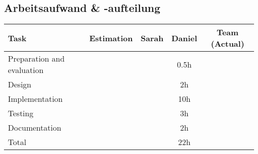 \subsection{Arbeitsaufwand \& -aufteilung}
\begin{tabular} {| l | c | c | c | c |}
	\hline
	Task & Estimation & Sarah & Daniel & Team (Actual)	\\ \hline \hline
	Preparation and evaluation &  &  & 0.5h & 		\\ \hline
	Design &   &  &	2h & 			\\ \hline
	Implementation & &  & 10h &  \\ \hline
	Testing & 	& 	& 3h &  \\ \hline
	Documentation	&  &  & 2h & 	\\ \hline 
	Total	& 	&  & 22h &  \\
	\hline
\end{tabular}